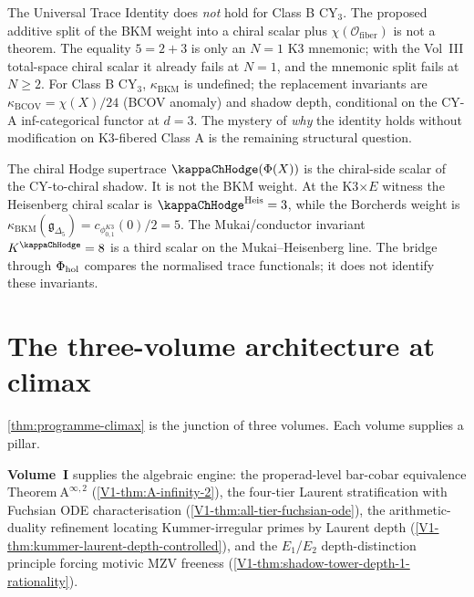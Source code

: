 \begin{remark}
The Universal Trace Identity does \emph{not} hold for Class B
CY$_{3}$. The proposed additive split of the BKM weight into a chiral
scalar plus $\chi(\mathcal{O}_{\mathrm{fiber}})$ is not a theorem.
The equality $5=2+3$ is only an $N=1$ K3 mnemonic; with the Vol~III
total-space chiral scalar it already fails at $N=1$, and the mnemonic
split fails at $N \ge 2$.
For Class B CY$_{3}$, $\kappa_{\mathrm{BKM}}$ is undefined; the
replacement invariants are $\kappa_{\mathrm{BCOV}} = \chi(X)/24$
(BCOV anomaly) and shadow depth, conditional on the CY-A
inf-categorical functor at $d = 3$. The mystery of \emph{why} the
identity holds without modification on K3-fibered Class A is the
remaining structural question.
\end{remark}

\begin{remark}
The chiral Hodge supertrace $\kappaChHodge(\Phi(X))$ is the
chiral-side scalar of the CY-to-chiral shadow. It is not the BKM
weight. At the K3$\times E$ witness the Heisenberg chiral scalar is
$\kappaChHodge^{\mathrm{Heis}}=3$, while the Borcherds weight
is $\kappa_{\mathrm{BKM}}(\mathfrak g_{\Delta_5})
=c_{\phi_{0,1}^{K3}}(0)/2=5$. The Mukai/conductor invariant
$K^{\kappaChHodge}=8$ is a third scalar on the
Mukai--Heisenberg line. The bridge through $\Phi_{\mathrm{hol}}$ compares the
normalised trace functionals; it does not identify these invariants.
\end{remark}

\section{The three-volume architecture at climax}
\label{sec:climax-architecture}

\cref{thm:programme-climax} is the junction of three volumes. Each
volume supplies a pillar.

\textbf{Volume~I} supplies the algebraic engine: the properad-level
bar-cobar equivalence $\mathrm{Theorem~A}^{\infty,2}$
(\cref{V1-thm:A-infinity-2}), the four-tier Laurent stratification with
Fuchsian ODE characterisation
(\cref{V1-thm:all-tier-fuchsian-ode}), the arithmetic-duality
refinement locating Kummer-irregular primes by Laurent depth
(\cref{V1-thm:kummer-laurent-depth-controlled}), and the $E_{1}$/$E_{2}$
depth-distinction principle forcing motivic MZV freeness
(\cref{V1-thm:shadow-tower-depth-1-rationality}).

